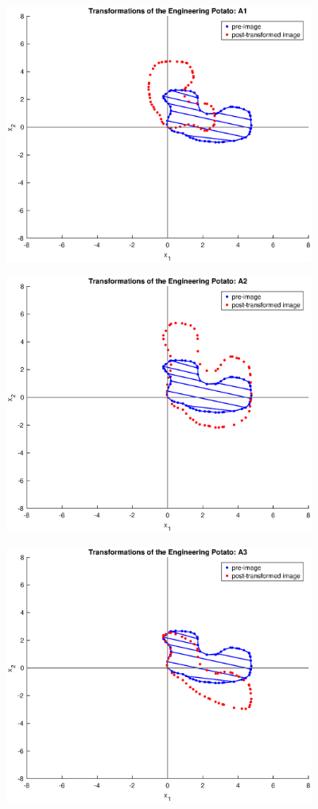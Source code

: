 \documentclass{article}
\begin{document}
\includegraphics [width=4in]{2.eps}

\includegraphics [width=4in]{3.eps}

\includegraphics [width=4in]{4.eps}
\end{document}
